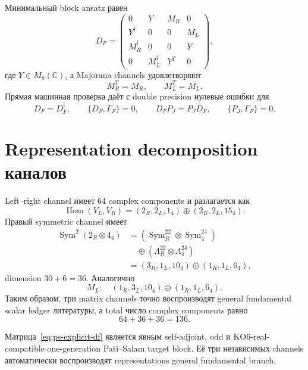 Минимальный block ansatz равен
\begin{equation}
 D_F=
 \begin{pmatrix}
 0&Y&M_R&0\\
 Y^\dagger&0&0&M_L\\
 M_R^\dagger&0&0&\bar Y\\
 0&M_L^\dagger&Y^T&0
 \end{pmatrix},
 \label{eq:ps-explicit-df}
\end{equation}
где \(Y\in M_8(\mathbb C)\), а Majorana channels удовлетворяют
\begin{equation}
 M_R^T=M_R,
 \qquad
 M_L^T=M_L.
\end{equation}
Прямая машинная проверка даёт с double precision нулевые ошибки для
\begin{equation}
 D_F=D_F^\dagger,
 \qquad
 \{D_F,\Gamma_F\}=0,
 \qquad
 D_FP_J=P_J\bar D_F,
 \qquad
 \{P_J,\Gamma_F\}=0.
\end{equation}

\section{Representation decomposition каналов}

Left--right channel имеет 64 complex components и разлагается как
\begin{equation}
 \operatorname{Hom}(V_L,V_R)
 =(2_R,2_L,1_4)\oplus(2_R,2_L,15_4).
\end{equation}
Правый symmetric channel имеет
\begin{align}
 \operatorname{Sym}^2(2_R\otimes4_4)
 &=(\operatorname{Sym}^22_R\otimes\operatorname{Sym}^24_4)
 \\&\quad\oplus
 (\Lambda^22_R\otimes\Lambda^24_4)\\
 &=(3_R,1_L,10_4)\oplus(1_R,1_L,6_4),
\end{align}
dimension \(30+6=36\). Аналогично
\begin{equation}
 M_L:\quad(1_R,3_L,10_4)\oplus(1_R,1_L,6_4).
\end{equation}
Таким образом, три matrix channels точно воспроизводят general fundamental
scalar ledger литературы, а total число complex components равно
\begin{equation}
 64+36+36=136.
\end{equation}

\begin{theorem}
Матрица~\eqref{eq:ps-explicit-df} является явным self-adjoint, odd и
KO6-real-compatible one-generation Pati--Salam target block. Её три
независимых channels автоматически воспроизводят representations
general fundamental branch.
\end{theorem}

